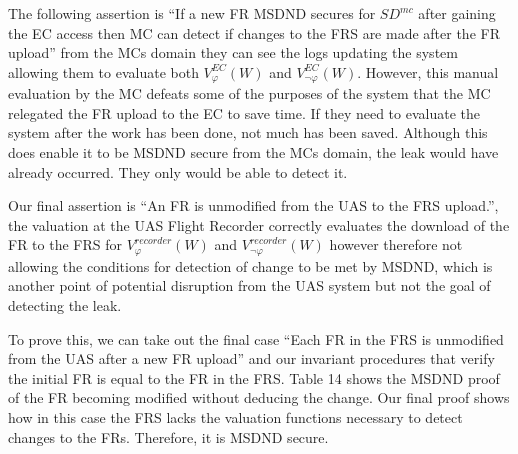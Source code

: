 \documentclass[10pt,journal,compsoc]{IEEEtran}
\begin{document}
The following assertion is ``If a new FR MSDND secures for $SD^{mc}$ after gaining the EC access then MC can detect if changes to the FRS are made after the FR upload'' from the MCs domain they can see the logs updating the system allowing them to evaluate both $V^{EC}_{\varphi}(W)$ and $V^{EC}_{\lnot\varphi}(W)$. However, this manual evaluation by the MC defeats some of the purposes of the system that the MC relegated the FR upload to the EC to save time. If they need to evaluate the system after the work has been done, not much has been saved. Although this does enable it to be MSDND secure from the MCs domain, the leak would have already occurred. They only would be able to detect it.

Our final assertion is ``An FR is unmodified from the UAS to the FRS upload.'', the valuation at the UAS Flight Recorder correctly evaluates the download of the FR to the FRS for $V^{recorder}_{\varphi}(W)$ and $V^{recorder}_{\lnot\varphi}(W)$ however therefore not allowing the conditions for detection of change to be met by MSDND, which is another point of potential disruption from the UAS system but not the goal of detecting the leak. 

To prove this, we can take out the final case ``Each FR in the FRS is unmodified from the UAS after a new FR upload'' and our invariant procedures that verify the initial FR is equal to the FR in the FRS. Table 14 shows the MSDND proof of the FR becoming modified without deducing the change. Our final proof shows how in this case the FRS lacks the valuation functions necessary to detect changes to the FRs. Therefore, it is MSDND secure. 
\end{document}
